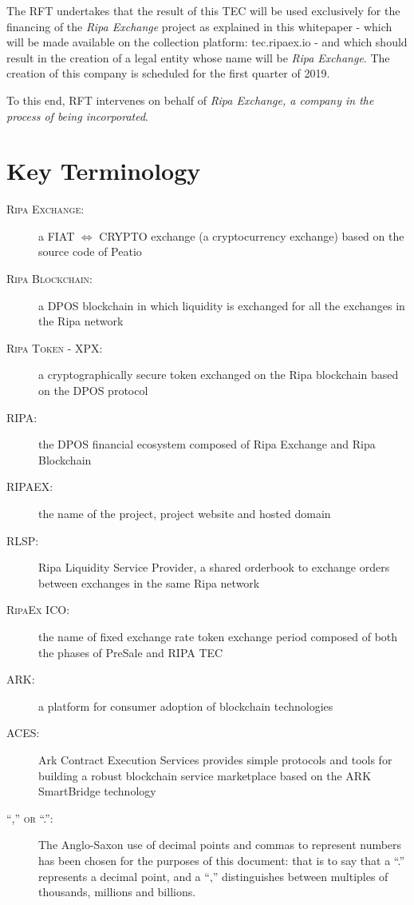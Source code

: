 \documentclass[11pt,fleqn,oneside]{book} %
\begin{document}
The RFT undertakes that the result of this TEC will be used exclusively for the financing of the \emph{Ripa Exchange} project as explained in this 
whitepaper - which will be made available on the collection platform: tec.ripaex.io - and which should result in the creation of a 
legal entity whose name will be \emph{Ripa Exchange}. The creation of this company is scheduled for the first quarter of 2019.

To this end, RFT intervenes on behalf of \emph{Ripa Exchange, a company in the process of being incorporated}.





\section{Key Terminology}
\begin{description}
	\item[\textsc{Ripa Exchange:}] a FIAT $\Leftrightarrow$ CRYPTO exchange (a cryptocurrency exchange) based on the source code
	of Peatio \cite{peatio}
	\item[\textsc{Ripa Blockchain:}] a DPOS blockchain in which liquidity is exchanged for all the exchanges in the Ripa network
	\item[\textsc{Ripa Token - XPX:}] a cryptographically secure token exchanged on the Ripa blockchain based on the DPOS protocol
	\item[\textsc{RIPA:}] the DPOS financial ecosystem composed of Ripa Exchange and Ripa Blockchain
	\item[\textsc{RIPAEX:}] the name of the project, project website and hosted domain
    \item[\textsc{RLSP:}] Ripa Liquidity Service Provider, a shared orderbook to exchange orders between exchanges in the same Ripa network
	\item[\textsc{RipaEx ICO:}] the name of fixed exchange rate token exchange period composed of both the phases of PreSale and RIPA TEC
	\item[\textsc{ARK:}] a platform for consumer adoption of blockchain technologies \cite{ark}
	\item[\textsc{ACES:}] Ark Contract Execution Services \cite{aces} provides simple protocols and tools for building a robust 
	blockchain service marketplace based on the ARK SmartBridge technology
    \item[\textsc{“,” or “.”:}] The Anglo-Saxon use of decimal points and commas to represent numbers has
been chosen for the purposes of this document: that is to say that a “.” represents a decimal point, and a “,”
distinguishes between multiples of thousands, millions and billions.
    \end{description}
\end{document}

